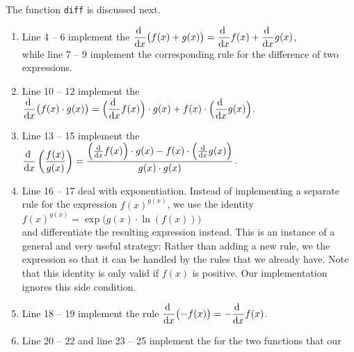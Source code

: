 \noindent
The function \texttt{diff} is discussed next.
\begin{enumerate}
\item Line 4 -- 6 implement the 
      $\displaystyle\frac{\mathrm{d}\;}{\mathrm{d}x}\bigl(f(x) + g(x)\bigr) 
       = \frac{\mathrm{d}\;}{\mathrm{d}x} f(x) + \frac{\mathrm{d}\;}{\mathrm{d}x} g(x)$,
      \\[0.1cm]
      while line 7 -- 9 implement the corresponding rule for the difference of two expressions.
\item Line 10 -- 12 implement the 
      \\[0.2cm]
      \hspace*{1.3cm}
      $\displaystyle\frac{\mathrm{d}\;}{\mathrm{d}x}\bigl(f(x) \cdot g(x)\bigr)
       = \Bigl(\frac{\mathrm{d}\;}{\mathrm{d}x} f(x)\Bigr) \cdot g(x)
       + f(x) \cdot \Bigl(\frac{\mathrm{d}\;}{\mathrm{d}x} g(x)\Bigr)$.
\item Line 13 -- 15 implement the 
      \\[0.2cm]
      \hspace*{1.3cm}
      $\displaystyle\frac{\mathrm{d}\;}{\mathrm{d}x}\left(\frac{f(x)}{g(x)}\right)
       = \frac{\Bigl(\frac{\mathrm{d}}{\mathrm{d}x} f(x)\Bigr) \cdot g(x)
              - f(x) \cdot \Bigl(\frac{\mathrm{d}}{\mathrm{d}x} g(x)\Bigr)}{g(x) \cdot g(x)}$.
\item Line 16 -- 17 deal with exponentiation.  Instead of implementing a separate rule for the expression
      $f(x)^{g(x)}$, we use the identity
      \\[0.2cm]
      \hspace*{1.3cm}
      $f(x)^{g(x)} = \exp\bigl(g(x) \cdot \ln(f(x))\bigr)$
      \\[0.2cm]
      and differentiate the resulting expression instead.  This is an instance of a general and very
      useful strategy:  Rather than adding a new rule, we  the expression so that it can be
      handled by the rules that we already have.  Note that this identity is only valid if $f(x)$ is
      positive.  Our implementation ignores this side condition.
\item Line 18 -- 19 implement the rule
      $\displaystyle\frac{\mathrm{d}\;}{\mathrm{d}x}\bigl(-f(x)\bigr) 
       = -\frac{\mathrm{d}\;}{\mathrm{d}x} f(x)$.
\item Line 20 -- 22 and line 23 -- 25 implement the  for the two functions that our

\end{enumerate}
